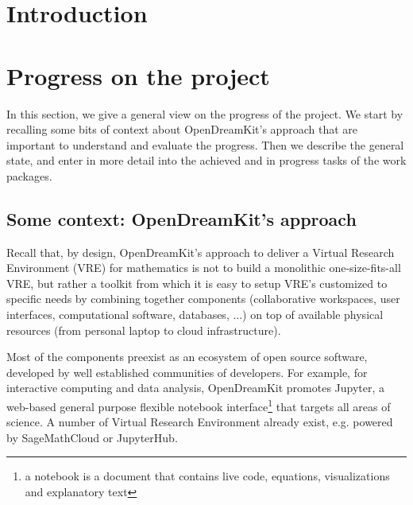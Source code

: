 \documentclass{deliverablereport}
\author{Nicolas Thiéry \& Benoît Pilorget}
\begin{document}
\maketitle
\githubissuedescription
\newpage

\newcommand{\ODK}{OpenDreamKit\xspace}
\tableofcontents\newpage

\section{Introduction}




\section{Progress on the project}

In this section, we give a general view on the progress of the
project. We start by recalling some bits of context about \ODK's
approach that are important to understand and evaluate the
progress. Then we describe the general state, and enter in more detail
into the achieved and in progress tasks of the work packages.

\subsection{Some context: \ODK's approach}
Recall that, by design, \ODK's approach to deliver a Virtual Research
Environment (VRE) for mathematics is not to build a monolithic
one-size-fits-all VRE, but rather a toolkit from which it is easy to
setup VRE's customized to specific needs by combining together
components (collaborative workspaces, user interfaces, computational
software, databases, ...) on top of available physical resources (from
personal laptop to cloud infrastructure).

Most of the components preexist as an ecosystem of open source
software, developed by well established communities of developers. For
example, for interactive computing and data analysis, OpenDreamKit
promotes Jupyter, a web-based general purpose flexible notebook
interface\footnote{a notebook is a document that contains live code,
  equations, visualizations and explanatory text} that targets all
areas of science. A number of Virtual Research Environment already
exist, e.g. powered by SageMathCloud or JupyterHub.
\end{document}
